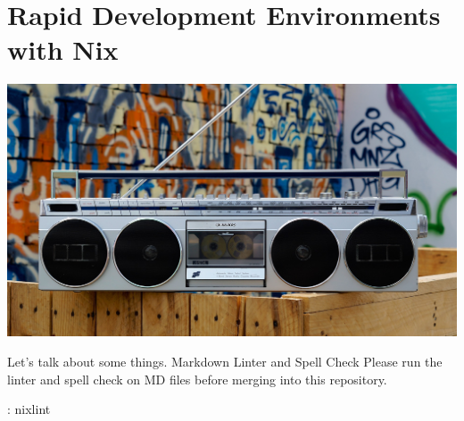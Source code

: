 \chapter{Rapid Development Environments with Nix}

\includegraphics[scale=0.85]{../images/boombox-5693150_1920.jpg}

\justify{}
Let's talk about some things.
\justify{}
Markdown Linter and Spell Check
\justify{}
Please run the linter and spell check on MD files before merging into this
repository.

\begin{mybox}{\thetcbcounter: nixlint}
    
\end{mybox}

